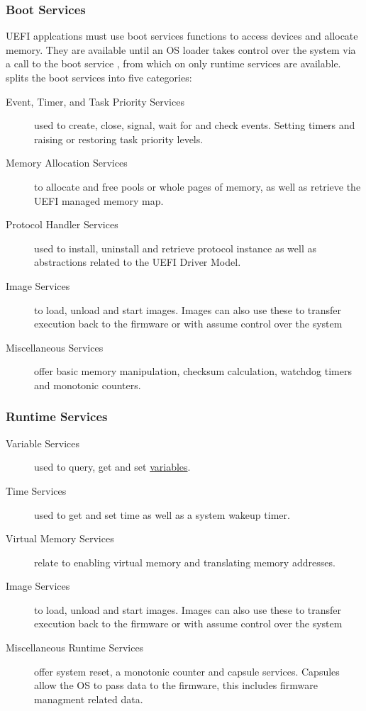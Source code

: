 

\subsubsection{Boot Services}

\ac{UEFI} applcations must use boot services functions to access devices and allocate memory. They are available until an \ac{OS} loader takes control over the system via a call to the boot service , from which on only runtime services are available. \cite[Section 7]{uefi-spec} splits the boot services into five categories:

\begin{description}
    \item [Event, Timer, and Task Priority Services] used to create, close, signal, wait for and check events. Setting timers and raising or restoring task priority levels.
    \item [Memory Allocation Services] to allocate and free pools or whole pages of memory, as well as retrieve the \ac{UEFI} managed memory map.
    \item [Protocol Handler Services] used to install, uninstall and retrieve protocol instance as well as abstractions related to the \ac{UEFI} Driver Model.
    \item [Image Services] to load, unload and start images. Images can also use these to transfer execution back to the firmware or with  assume control over the system
    \item [Miscellaneous Services] offer basic memory manipulation, checksum calculation, watchdog timers and monotonic counters.
\end{description}

\subsubsection{Runtime Services}


\begin{description}
    \item [Variable Services] used to query, get and set \hyperref[sec:uefi-pi:uefi:variables]{variables}.
    \item [Time Services] used to get and set time as well as a system wakeup timer.
    \item [Virtual Memory Services] relate to enabling virtual memory and translating memory addresses.
    \item [Image Services] to load, unload and start images. Images can also use these to transfer execution back to the firmware or with  assume control over the system
    \item [Miscellaneous Runtime Services] offer system reset, a monotonic counter and capsule services. Capsules allow the \ac{OS} to pass data to the firmware, this includes firmware managment related data.
\end{description}

